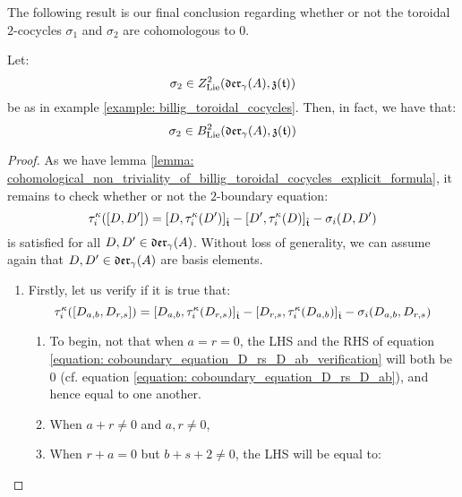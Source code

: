         The following result is our final conclusion regarding whether or not the toroidal $2$-cocycles $\sigma_1$ and $\sigma_2$ are cohomologous to $0$.
        \begin{proposition} \label{prop: cohomological_non_triviality_of_billig_toroidal_cocycles}
            Let:
                $$\sigma_2 \in Z^2_{\mathrm{Lie}}(\mathfrak{der}_{\gamma}(A), \mathfrak{z}(\mathfrak{t}) )$$
            be as in example \ref{example: billig_toroidal_cocycles}. Then, in fact, we have that:
                $$\sigma_2 \in B^2_{\mathrm{Lie}}(\mathfrak{der}_{\gamma}(A), \mathfrak{z}(\mathfrak{t}))$$
        \end{proposition}
            \begin{proof}
                As we have lemma \ref{lemma: cohomological_non_triviality_of_billig_toroidal_cocycles_explicit_formula}, it remains to check whether or not the $2$-boundary equation:
                    $$\tau_i^{\kappa}([D, D']) = [D, \tau_i^{\kappa}(D')]_{\hat{\mathfrak{t}}} - [D', \tau_i^{\kappa}(D)]_{\hat{\mathfrak{t}}} - \sigma_i(D, D')$$
                is satisfied for all $D, D' \in \mathfrak{der}_{\gamma}(A)$. Without loss of generality, we can assume again that $D, D' \in \mathfrak{der}_{\gamma}(A)$ are basis elements.
                \begin{enumerate}
                    \item Firstly, let us verify if it is true that:
                        \begin{equation} \label{equation: coboundary_equation_D_rs_D_ab_verification}
                            \tau_i^{\kappa}([D_{a, b}, D_{r, s}]) = [D_{a, b}, \tau_i^{\kappa}(D_{r, s})]_{\hat{\mathfrak{t}}} - [D_{r, s}, \tau_i^{\kappa}(D_{a, b})]_{\hat{\mathfrak{t}}} - \sigma_i(D_{a, b}, D_{r, s})
                        \end{equation}
                    \begin{enumerate}
                        \item To begin, not that when $a = r = 0$, the LHS and the RHS of equation \eqref{equation: coboundary_equation_D_rs_D_ab_verification} will both be $0$ (cf. equation \eqref{equation: coboundary_equation_D_rs_D_ab}), and hence equal to one another.
                        \item When $a + r \not = 0$ and $a, r \not = 0$, 
                        \item When $r + a = 0$ but $b + s + 2 \not = 0$, the LHS will be equal to:
                            $$
$$
\end{enumerate}
\end{enumerate}
\end{proof}
